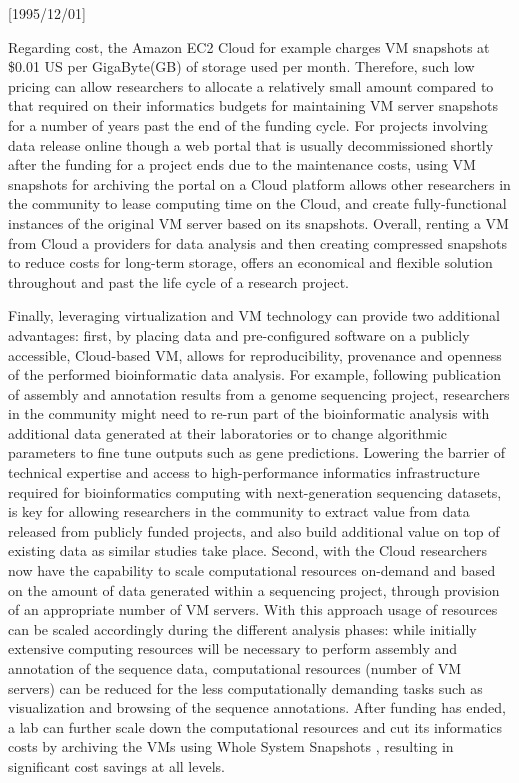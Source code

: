 \NeedsTeXFormat{LaTeX2e}[1995/12/01] \documentclass[10pt]{bmc_article}
\newenvironment{bmcformat}{\begin{raggedright}\baselineskip20pt\sloppy\setboolean{publ}{false}}{\end{raggedright}\baselineskip20pt\sloppy}
\begin{document}
\begin{bmcformat}
Regarding cost, the Amazon EC2 Cloud \cite{awsec2} for example charges VM snapshots at \$0.01 US 
per GigaByte(GB) of storage used per month. Therefore, such low pricing can allow researchers to allocate 
a relatively small amount compared to that required on their informatics budgets  for maintaining VM 
server snapshots for a number of years past the end of the funding cycle. For projects involving data 
release online though a web portal  that is usually decommissioned shortly after the funding for a 
project ends due to the maintenance costs, using VM snapshots for archiving the portal on a Cloud 
platform allows other researchers in the community to lease computing time on the Cloud, and create 
fully-functional instances of the original VM server based on its snapshots. Overall, renting a VM from 
Cloud a providers for data analysis and then creating compressed snapshots to reduce costs for long-term 
storage, offers an economical and flexible solution throughout and past the life cycle of a research project.

Finally, leveraging virtualization and VM technology can provide two additional advantages: first, 
by placing data and pre-configured software on a publicly accessible, Cloud-based VM, allows for 
reproducibility, provenance and openness of the performed bioinformatic data analysis. For example, 
following publication of assembly and annotation results from a genome sequencing project, researchers 
in the community might need to re-run part of the bioinformatic analysis with additional data generated
at their laboratories or to change algorithmic parameters to fine tune outputs such as gene predictions. 
Lowering the barrier of technical expertise and access to high-performance informatics infrastructure 
required for bioinformatics computing with next-generation sequencing datasets, is key for allowing 
researchers in the community to extract value from  data released from publicly funded projects, and also 
build additional value on top of existing data as similar studies take place. Second, with the Cloud researchers 
now have the capability to scale computational resources on-demand and based on the amount of data 
generated within a sequencing project, through provision of an appropriate number of VM servers. With
this approach usage of resources can be scaled accordingly during the different analysis phases: while 
initially extensive computing resources will be necessary to perform assembly and annotation of the sequence 
data, computational resources (number of VM servers) can be reduced for the less computationally demanding 
tasks such as visualization and browsing of the sequence annotations. After funding has ended, a lab can further 
scale down the computational resources and cut its informatics costs by archiving the VMs using Whole 
System Snapshots \cite{Dudley2010}, resulting in significant cost savings at all levels.



\end{bmcformat}
\end{document}
